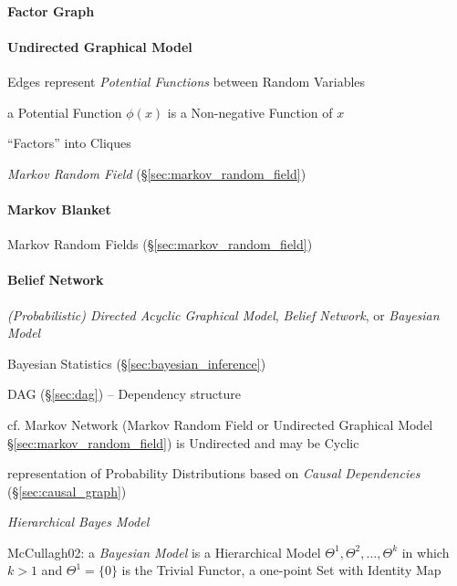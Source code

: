 \paragraph{Factor Graph}\label{sec:factor_graph}\hfill


\paragraph{Undirected Graphical Model}
\label{sec:undirected_graphical_model}\hfill

Edges represent \emph{Potential Functions} between Random Variables

a Potential Function $\phi(x)$ is a Non-negative Function of $x$

``Factors'' into Cliques

\fist \emph{Markov Random Field} (\S\ref{sec:markov_random_field})



\paragraph{Markov Blanket}\label{sec:markov_blanket}\hfill

Markov Random Fields (\S\ref{sec:markov_random_field})



\paragraph{Belief Network}\label{sec:belief_network}\hfill

\emph{(Probabilistic) Directed Acyclic Graphical Model},
\emph{Belief Network}, or \emph{Bayesian Model}

Bayesian Statistics (\S\ref{sec:bayesian_inference})

DAG (\S\ref{sec:dag}) -- Dependency structure

cf. Markov Network (Markov Random Field or Undirected Graphical Model
\S\ref{sec:markov_random_field}) is Undirected and may be Cyclic

representation of Probability Distributions based on \emph{Causal Dependencies}
(\S\ref{sec:causal_graph})

\emph{Hierarchical Bayes Model}

McCullagh02: a \emph{Bayesian Model} is a Hierarchical Model
$\Theta^1, \Theta^2, \ldots, \Theta^k$ in which $k > 1$ and $\Theta^1 = \{0\}$
is the Trivial Functor, a one-point Set with Identity Map

